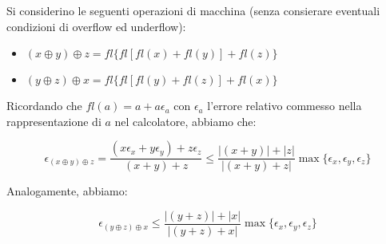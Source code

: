 Si considerino le seguenti operazioni di macchina (senza consierare eventuali condizioni di overflow ed underflow):

\begin{itemize}

\item \((x \oplus y) \oplus z = fl\{ fl[ fl(x) + fl(y) ] + fl(z)\}\)
\item \((y \oplus z) \oplus x = fl\{ fl[ fl(y) + fl(z) ] + fl(x)\}\)

\end{itemize}

\noindent Ricordando che \(fl(a) = a + a\epsilon_a\) con \(\epsilon_a\) l'errore relativo commesso nella rappresentazione di \(a\) nel calcolatore, abbiamo che:

\[
\epsilon_{(x \oplus y) \oplus z } = \frac{(x \epsilon_x + y \epsilon_y) + z \epsilon_z}{(x+y)+z} \leq \frac{|(x+y)| + |z|}{|(x+y)+z|} \max\{\epsilon_x, \epsilon_y, \epsilon_z\}
\]

\noindent Analogamente, abbiamo:

\[
\epsilon_{(y \oplus z) \oplus x } \leq \frac{ |(y+z)| + |x| }{|(y+z) + x|}\max\{\epsilon_x, \epsilon_y, \epsilon_z\}
\]
